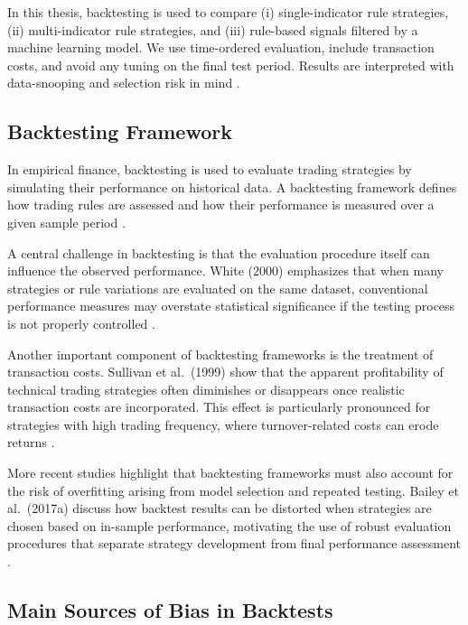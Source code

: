 In this thesis, backtesting is used to compare (i) single-indicator rule strategies,
(ii) multi-indicator rule strategies, and (iii) rule-based signals filtered by a machine
learning model. We use time-ordered evaluation, include transaction costs, and avoid any
tuning on the final test period. Results are interpreted with data-snooping and selection
risk in mind \citep{white2000reality, sullivan1999data, bailey2017probability}.


\subsection{Backtesting Framework}

In empirical finance, backtesting is used to evaluate trading strategies by
simulating their performance on historical data. A backtesting framework
defines how trading rules are assessed and how their performance is measured
over a given sample period \citep{white2000reality}.

A central challenge in backtesting is that the evaluation procedure itself can
influence the observed performance. White (2000) emphasizes that when many
strategies or rule variations are evaluated on the same dataset, conventional
performance measures may overstate statistical significance if the testing
process is not properly controlled \citep{white2000reality}.

Another important component of backtesting frameworks is the treatment of
transaction costs. Sullivan et al.~(1999) show that the apparent profitability of
technical trading strategies often diminishes or disappears once realistic
transaction costs are incorporated. This effect is particularly pronounced for
strategies with high trading frequency, where turnover-related costs can erode
returns \citep{sullivan1999data}.

More recent studies highlight that backtesting frameworks must also account for
the risk of overfitting arising from model selection and repeated testing.
Bailey et al.~(2017a) discuss how backtest results can be distorted when
strategies are chosen based on in-sample performance, motivating the use of
robust evaluation procedures that separate strategy development from final
performance assessment \citep{bailey2017probability}.

\subsection{Main Sources of Bias in Backtests}

